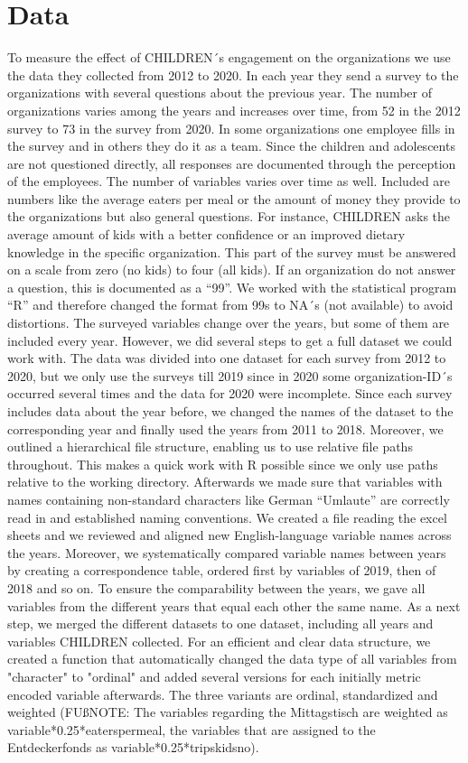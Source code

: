 \documentclass[12pt, a4paper, titlepage]{article}\usepackage[]{graphicx}\usepackage[]{color}
\begin{document}
\section{Data}

To measure the effect of CHILDREN´s engagement on the organizations we use the data they collected from 2012 to 2020. In each year they send a survey to the organizations with several questions about the previous year. The number of organizations varies among the years and increases over time, from 52 in the 2012 survey to 73 in the survey from 2020. In some organizations one employee fills in the survey and in others they do it as a team. Since the children and adolescents are not questioned directly, all responses are documented through the perception of the employees. The number of variables varies over time as well. Included are numbers like the average eaters per meal or the amount of money they provide to the organizations but also general questions. For instance, CHILDREN asks the average amount of kids with a better confidence or an improved dietary knowledge in the specific organization. This part of the survey must be answered on a scale from zero (no kids) to four (all kids). If an organization do not answer a question, this is documented as a “99”. We worked with the statistical program “R” and therefore changed the format from 99s to NA´s (not available) to avoid distortions. The surveyed variables change over the years, but some of them are included every year. 
However, we did several steps to get a full dataset we could work with. The data was divided into one dataset for each survey from 2012 to 2020, but we only use the surveys till 2019 since in 2020 some organization-ID´s occurred several times and the data for 2020 were incomplete. Since each survey includes data about the year before, we changed the names of the dataset to the corresponding year and finally used the years from 2011 to 2018. Moreover, we outlined a hierarchical file structure, enabling us to use relative file paths throughout. This makes a quick work with R possible since we only use paths relative to the working directory. Afterwards we made sure that variables with names containing non-standard characters like German “Umlaute” are correctly read in and established naming conventions. We created a file reading the excel sheets and we reviewed and aligned new English-language variable names across the years. Moreover, we systematically compared variable names between years by creating a correspondence table, ordered first by variables of 2019, then of 2018 and so on. To ensure the comparability between the years, we gave all variables from the different years that equal each other the same name. As a next step, we merged the different datasets to one dataset, including all years and variables CHILDREN collected. For an efficient and clear data structure, we created a function that automatically changed the data type of all variables from "character" to "ordinal" and added several versions for each initially metric encoded variable afterwards. The three variants are ordinal, standardized and weighted (FUßNOTE: The variables regarding the Mittagstisch are weighted as variable*0.25*eaterspermeal, the variables that are assigned to the Entdeckerfonds as variable*0.25*tripskidsno). 
\end{document}
